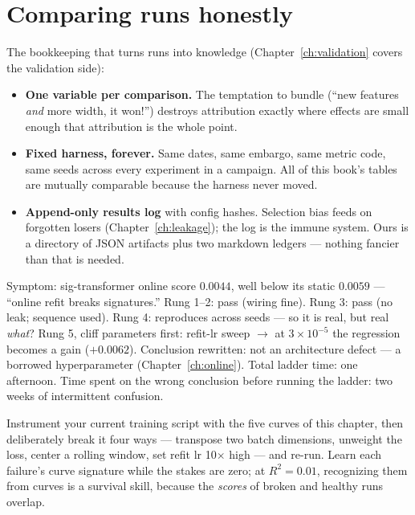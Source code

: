 \section{Comparing runs honestly}

The bookkeeping that turns runs into knowledge
(Chapter~\ref{ch:validation} covers the validation side):

\begin{itemize}
\item \textbf{One variable per comparison.} The temptation to bundle
  (``new features \emph{and} more width, it won!'') destroys attribution
  exactly where effects are small enough that attribution is the whole
  point.
\item \textbf{Fixed harness, forever.} Same dates, same embargo, same
  metric code, same seeds across every experiment in a campaign. All of
  this book's tables are mutually comparable because the harness never
  moved.
\item \textbf{Append-only results log} with config hashes. Selection bias
  feeds on forgotten losers (Chapter~\ref{ch:leakage}); the log is the
  immune system. Ours is a directory of JSON artifacts plus two markdown
  ledgers --- nothing fancier than that is needed.
\end{itemize}

\begin{jsbox}
Symptom: sig-transformer online score $0.0044$, well below its static
$0.0059$ --- ``online refit breaks signatures.''
Rung 1--2: pass (wiring fine). Rung 3: pass (no leak; sequence used).
Rung 4: reproduces across seeds --- so it is real, but real
\emph{what}? Rung 5, cliff parameters first: refit-lr sweep $\to$ at
$3\times10^{-5}$ the regression becomes a gain ($+0.0062$).
Conclusion rewritten: not an architecture defect --- a borrowed
hyperparameter (Chapter~\ref{ch:online}). Total ladder time: one
afternoon. Time spent on the wrong conclusion before running the ladder:
two weeks of intermittent confusion.
\end{jsbox}

\begin{drillbox}
Instrument your current training script with the five curves of this
chapter, then deliberately break it four ways --- transpose two batch
dimensions, unweight the loss, center a rolling window, set refit lr
10$\times$ high --- and re-run. Learn each failure's curve signature
while the stakes are zero; at $R^2=0.01$, recognizing them from curves is
a survival skill, because the \emph{scores} of broken and healthy runs
overlap.
\end{drillbox}
